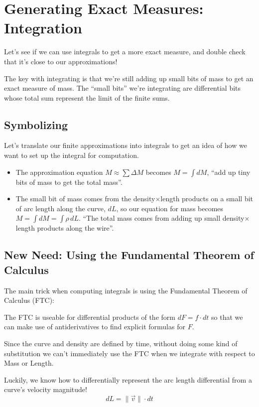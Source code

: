 \documentclass{ximera}
\begin{document}
\section*{Generating Exact Measures: Integration}

Let's see if we can use integrals to get a more exact measure, and double check that it's close to our approximations!

The key with integrating is that we're still adding up small bits of mass to get an exact measure of mass. The ``small bits'' we're integrating are differential bits whose total sum represent the limit of the finite sums.

\subsection*{Symbolizing}

Let's translate our finite approximations into integrals to get an idea of how we want to set up the integral for computation.

\begin{itemize}
\item The approximation equation $M \approx \sum \Delta M$ becomes $M = \int dM$, ``add up tiny bits of mass to get the total mass''.
\item The small bit of mass comes from the density$\times$length products on a small bit of arc length along the curve, $dL$, so our equation for mass becomes $M = \int dM = \int \rho \, dL$. ``The total mass comes from adding up small density$\times$length products along the wire''.
\end{itemize}

\subsection*{New Need: Using the Fundamental Theorem of Calculus}

The main trick when computing integrals is using the Fundamental Theorem of Calculus (FTC):

The FTC is useable for differential products of the form $dF = f \cdot dt$ so that we can make use of antiderivatives to find explicit formulas for $F$.

Since the curve and density are defined by time, without doing some kind of substitution we can't immediately use the FTC when we integrate with respect to Mass or Length.

Luckily, we know how to differentially represent the arc length differential from a curve's velocity magnitude!
\[
dL = \|\vec{v}\| \cdot dt
\]
\end{document}

